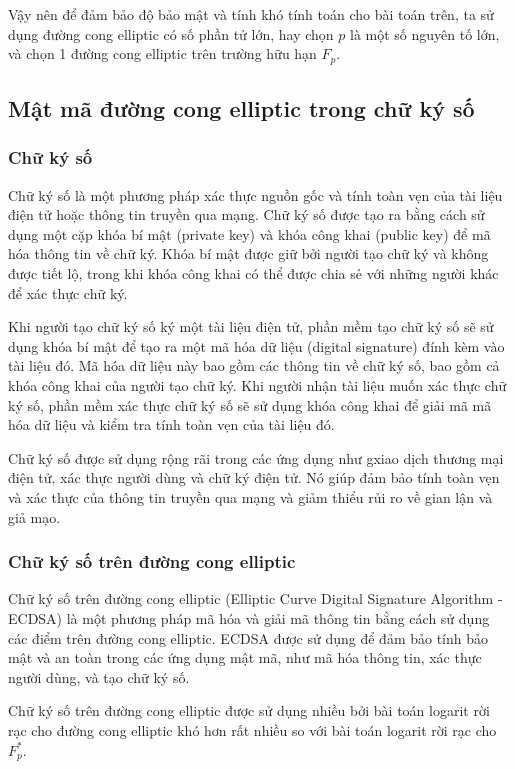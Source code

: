 Vậy nên để đảm bảo độ bảo mật và tính khó tính toán cho bài toán trên,
ta sử dụng đường cong elliptic có số phần tử lớn, hay chọn $p$ là một
số nguyên tố lớn, và chọn 1 đường cong elliptic trên trường hữu hạn $F_p$.

\subsection{Mật mã đường cong elliptic trong chữ ký số}
\subsubsection{Chữ ký số}


Chữ ký số là một phương pháp xác thực nguồn gốc và tính toàn vẹn của tài liệu điện tử hoặc thông tin truyền qua mạng. Chữ ký số được tạo ra bằng cách sử dụng một cặp khóa bí mật (private key) và khóa công khai (public key) để mã hóa thông tin về chữ ký. Khóa bí mật được giữ bởi người tạo chữ ký và không được tiết lộ, trong khi khóa công khai có thể được chia sẻ với những người khác để xác thực chữ ký.

Khi người tạo chữ ký số ký một tài liệu điện tử, phần mềm tạo chữ ký số sẽ sử dụng khóa bí mật để tạo ra một mã hóa dữ liệu (digital signature) đính kèm vào tài liệu đó. Mã hóa dữ liệu này bao gồm các thông tin về chữ ký số, bao gồm cả khóa công khai của người tạo chữ ký. Khi người nhận tài liệu muốn xác thực chữ ký số, phần mềm xác thực chữ ký số sẽ sử dụng khóa công khai để giải mã mã hóa dữ liệu và kiểm tra tính toàn vẹn của tài liệu đó.

Chữ ký số được sử dụng rộng rãi trong các ứng dụng như gxiao dịch thương mại điện tử, xác thực người dùng và chữ ký điện tử. Nó giúp đảm bảo tính toàn vẹn và xác thực của thông tin truyền qua mạng và giảm thiểu rủi ro về gian lận và giả mạo.

\subsubsection{Chữ ký số trên đường cong elliptic}

Chữ ký số trên đường cong elliptic (Elliptic Curve Digital Signature Algorithm - ECDSA) là một phương pháp mã hóa và giải mã thông tin bằng cách sử dụng các điểm trên đường cong elliptic. ECDSA được sử dụng để đảm bảo tính bảo mật và an toàn trong các ứng dụng mật mã, như mã hóa thông tin, xác thực người dùng, và tạo chữ ký số.

Chữ ký số trên đường cong elliptic được sử dụng nhiều bởi bài toán logarit rời
rạc cho đường cong elliptic khó hơn rất nhiều so với bài toán logarit rời rạc cho $F^*_p$.


